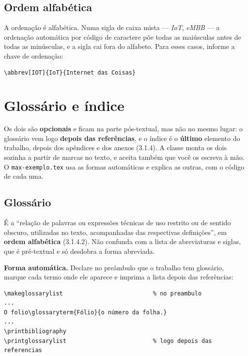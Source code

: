 \documentclass[dsc]{ufrj}
\begin{document}
  \section{Ordem alfabética}

  A ordenação é alfabética. Numa sigla de caixa mista --- \emph{IoT},
  \emph{eMBB} --- a ordenação automática por código de caractere põe todas as
  maiúsculas antes de todas as minúsculas, e a sigla cai fora do alfabeto. Para
  esses casos, informe a chave de ordenação:

\begin{verbatim}
\abbrev[IOT]{IoT}{Internet das Coisas}
\end{verbatim}

  \chapter{Glossário e índice}\label{cap:glossarioindice}

  Os dois são \textbf{opcionais} e ficam na parte pós-textual, mas não no mesmo
  lugar: o glossário vem logo \textbf{depois das referências}, e o índice é o
  \textbf{último} elemento do trabalho, depois dos apêndices e dos anexos
  (3.1.4). A classe monta os dois sozinha a partir de marcas no texto, e aceita
  também que você os escreva à mão. O \texttt{max-exemplo.tex} usa as formas
  automáticas e explica as outras, com o código de cada uma.

  \section{Glossário}

  É a ``relação de palavras ou expressões técnicas de uso restrito ou de
  sentido obscuro, utilizadas no texto, acompanhadas das respectivas
  definições'', em \textbf{ordem alfabética} (3.1.4.2). Não confunda com a
  lista de abreviaturas e siglas, que é pré-textual e só desdobra a forma
  abreviada.

  \textbf{Forma automática.} Declare no preâmbulo que o trabalho tem glossário,
  marque cada termo onde ele aparece e imprima a lista depois das referências:

\begin{verbatim}
\makeglossarylist                          % no preambulo
...
O folio\glossaryterm{Fólio}{o número da folha.}
...
\printbibliography
\printglossarylist                         % logo depois das referencias
\end{verbatim}
\end{document}
